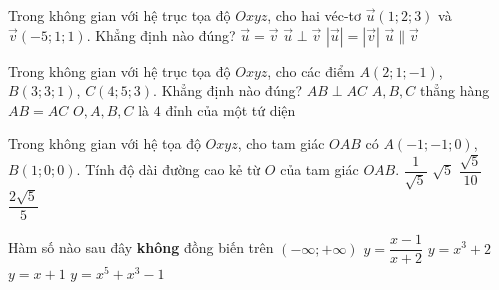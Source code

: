 \begin{ex}%
	Trong không gian với hệ trục tọa độ $Oxyz$, cho hai véc-tơ $\vec{u}\left(1;2;3\right)$ và $\vec{v}\left(-5;1;1\right)$. Khẳng định nào đúng?
	\choice
	{$\vec{u}=\vec{v}$}
	{\True $\vec{u}\perp \vec{v}$}
	{$\left| \vec{u}\right|=\left| \vec{v}\right|$}
	{$\vec{u}\parallel\vec{v}$}
\end{ex}
\begin{ex}%
	Trong không gian với hệ trục tọa độ $Oxyz$, cho các điểm $A\left(2; 1; -1\right)$, $B\left(3; 3; 1\right)$, $C\left(4; 5; 3\right)$. Khẳng định nào đúng?
	\choice
	{$AB\perp AC$}
	{\True $A, B, C$ thẳng hàng}
	{$AB = AC$}
	{$O, A, B, C$ là $4$ đỉnh của một tứ diện}
\end{ex}
\begin{ex}%
	Trong không gian với hệ tọa độ $Oxyz$, cho tam giác $OAB$ có $A\left(-1; -1; 0\right)$,  $B\left(1;0;0\right)$. Tính độ dài đường cao kẻ từ $O$ của tam giác $OAB$. 
	\choice
	{\True $\dfrac{1}{\sqrt{5}}$}
	{$\sqrt{5}$}
	{$\dfrac{\sqrt{5}}{10}$}
	{$\dfrac{2\sqrt{5}}{5}$}
\end{ex}
\begin{ex}%
	Hàm số nào sau đây \textbf{không} đồng biến trên $\left(-\infty;+\infty \right)$ 
	\choice
	{\True$y=\dfrac{x-1}{x+2}$} 
	{$y=x^3+2$}
	{$y=x+1$}
	{$y=x^5+x^3-1$}
\end{ex}
